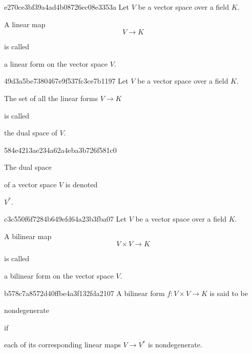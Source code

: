 \begin{note}{e270ce3bf39a4ad4b08726ec08e3353a}
    Let \( V \) be a vector space over a field \( K \). \begin{icloze}{1}A linear map
    \[
        V \to K
    \]\end{icloze}
    is called \begin{icloze}{2}a linear form on the vector space \( V \).\end{icloze}
\end{note}

\begin{note}{49d3a5be7380467e9f537fc3ce7b1197}
    Let \( V \) be a vector space over a field \( K \). \begin{icloze}{1}The set of all the linear forms \( V \to K \)\end{icloze} is called \begin{icloze}{2}the dual space of \( V \).\end{icloze}
\end{note}

\begin{note}{584e4213ae234a62a4eba3b726f581c0}
    \begin{icloze}{1}The dual space\end{icloze} of a vector space \( V \) is denoted \begin{icloze}{2}\( V^{*} \).\end{icloze}
\end{note}

\begin{note}{c3c550f6f7284b649efd64a23b3fba07}
    Let \( V \) be a vector space over a field \( K \). \begin{icloze}{1}A bilinear map
    \[
        V \times V \to K
    \]\end{icloze}
    is called \begin{icloze}{2}a bilinear form on the vector space \( V \).\end{icloze}
\end{note}

\begin{note}{b578c7a8572d40ffbe4a3f132fda2107}
    A bilinear form \( f : V \times V \to K \) is said to be \begin{icloze}{2}nondegenerate\end{icloze} if \begin{icloze}{1}each of its corresponding linear maps \( V \to V^{*} \) is nondegenerate.\end{icloze}
\end{note}

